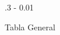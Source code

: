 \documentclass{iteraposter}\usepackage[]{graphicx}\usepackage[]{color}
\begin{document}
\begin{frame}
\begin{columns}[onlytextwidth]
\begin{column}{.3 \textwidth - 0.01\textwidth}
\begin{block}{Tabla General}
  \end{block}
\end{column}
  
\end{columns}


\end{frame}
\end{document}
